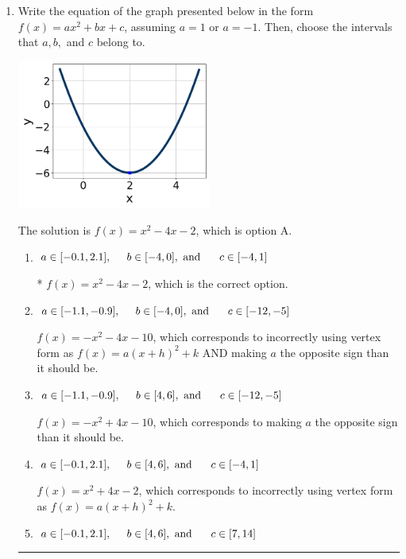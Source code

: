\documentclass{extbook}[14pt]
\newcommand{\litem}[1]{\item #1

\rule{\textwidth}{0.4pt}}
\begin{document}
\begin{enumerate}\litem{
Write the equation of the graph presented below in the form $f(x)=ax^2+bx+c$, assuming  $a=1$ or $a=-1$. Then, choose the intervals that $a, b,$ and $c$ belong to.

\begin{center}
    \includegraphics[width=0.5\textwidth]{../Figures/quadraticGraphToEquationB.png}
\end{center}




The solution is \( f(x) = x^{2} -4 x -2 \), which is option A.\begin{enumerate}[label=\Alph*.]
\item \( a \in [-0.1, 2.1], \hspace*{5mm} b \in [-4, 0], \text{ and } \hspace*{5mm} c \in [-4, 1] \)

* $f(x)=x^{2} -4 x -2$, which is the correct option.
\item \( a \in [-1.1, -0.9], \hspace*{5mm} b \in [-4, 0], \text{ and } \hspace*{5mm} c \in [-12, -5] \)

$f(x)=-x^{2} -4 x -10$, which corresponds to incorrectly using vertex form as $f(x) = a(x+h)^2+k$ AND making $a$ the opposite sign than it should be.
\item \( a \in [-1.1, -0.9], \hspace*{5mm} b \in [4, 6], \text{ and } \hspace*{5mm} c \in [-12, -5] \)

$f(x)=-x^{2} +4 x -10$, which corresponds to making $a$ the opposite sign than it should be.
\item \( a \in [-0.1, 2.1], \hspace*{5mm} b \in [4, 6], \text{ and } \hspace*{5mm} c \in [-4, 1] \)

$f(x)=x^{2} +4 x -2$, which corresponds to incorrectly using vertex form as $f(x) = a(x+h)^2+k$.
\item \( a \in [-0.1, 2.1], \hspace*{5mm} b \in [4, 6], \text{ and } \hspace*{5mm} c \in [7, 14] \)


\end{enumerate}}
\end{enumerate}
\end{document}

